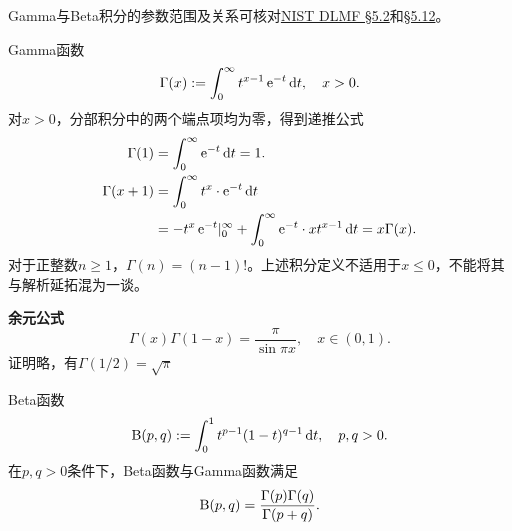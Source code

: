 Gamma与Beta积分的参数范围及关系可核对\href{https://dlmf.nist.gov/5.2}{NIST DLMF §5.2}和\href{https://dlmf.nist.gov/5.12}{§5.12}。
\begin{example}{Gamma函数}{}
	\begin{equation}\label{eq:calc-gamma-integral}
		\Gamma(x) := \int_0^\infty t^{x-1}\mathop{}\!\mathrm{e}^{-t}\mathop{}\!\mathrm{d} t,\quad x > 0.
	\end{equation}
	对$x > 0$，分部积分中的两个端点项均为零，得到递推公式
	\begin{subequations}\label{eq:calc-gamma-recursion}
		\begin{align}
			\Gamma(1) & = \int_0^\infty\mathop{}\!\mathrm{e}^{-t}\mathop{}\!\mathrm{d} t = 1.                                              \\
			\Gamma(x + 1) & = \int_0^\infty t^x \cdot \mathop{}\!\mathrm{e}^{-t}\mathop{}\!\mathrm{d} t\notag\\
						& = {-t^x\mathop{}\!\mathrm{e}^{-t}}\rvert_0^\infty + \int_0^\infty\mathop{}\!\mathrm{e}^{-t} \cdot xt^{x-1}\mathop{}\!\mathrm{d} t = x\Gamma(x).
		\end{align}
	\end{subequations}
	对于正整数$n \geq 1$，$\Gamma(n) = (n - 1)!$。上述积分定义不适用于$x \leq 0$，不能将其与解析延拓混为一谈。

	\textbf{余元公式}
	\begin{equation}\label{eq:calc-gamma-reflection}
		\Gamma(x)\Gamma(1 - x) = \frac{\pi}{\sin\pi x},\quad x \in (0,1).
	\end{equation}
	证明略，有$\Gamma(1/2) = \sqrt\pi$
\end{example}
\begin{example}{Beta函数}{}
	\begin{equation}\label{eq:calc-beta-integral}
		\Beta(p,q) := \int_0^1t^{p-1}(1 - t)^{q-1}\d t,\quad p,q > 0. %
	\end{equation}
	在$p,q > 0$条件下，Beta函数与Gamma函数满足
	\begin{equation}\label{eq:calc-beta-gamma}
		\operatorname{B}(p,q) = \frac{\Gamma(p)\Gamma(q)}{\Gamma(p + q)}.
	\end{equation}
\end{example}
